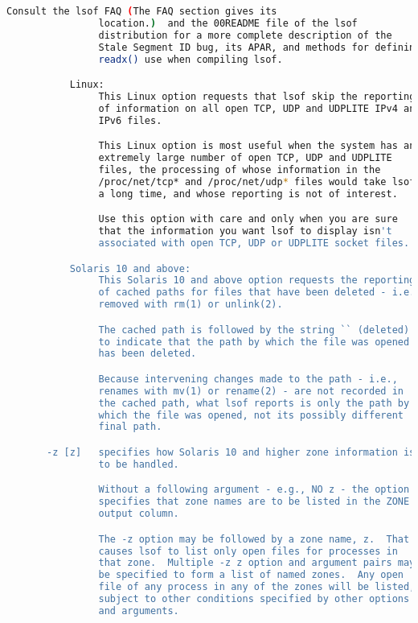 {{\begin{lstlisting}[language=bash]
                Consult the lsof FAQ (The FAQ section gives its
                location.)  and the 00README file of the lsof
                distribution for a more complete description of the
                Stale Segment ID bug, its APAR, and methods for defining
                readx() use when compiling lsof.

           Linux:
                This Linux option requests that lsof skip the reporting
                of information on all open TCP, UDP and UDPLITE IPv4 and
                IPv6 files.

                This Linux option is most useful when the system has an
                extremely large number of open TCP, UDP and UDPLITE
                files, the processing of whose information in the
                /proc/net/tcp* and /proc/net/udp* files would take lsof
                a long time, and whose reporting is not of interest.

                Use this option with care and only when you are sure
                that the information you want lsof to display isn't
                associated with open TCP, UDP or UDPLITE socket files.

           Solaris 10 and above:
                This Solaris 10 and above option requests the reporting
                of cached paths for files that have been deleted - i.e.,
                removed with rm(1) or unlink(2).

                The cached path is followed by the string `` (deleted)''
                to indicate that the path by which the file was opened
                has been deleted.

                Because intervening changes made to the path - i.e.,
                renames with mv(1) or rename(2) - are not recorded in
                the cached path, what lsof reports is only the path by
                which the file was opened, not its possibly different
                final path.

       -z [z]   specifies how Solaris 10 and higher zone information is
                to be handled.

                Without a following argument - e.g., NO z - the option
                specifies that zone names are to be listed in the ZONE
                output column.

                The -z option may be followed by a zone name, z.  That
                causes lsof to list only open files for processes in
                that zone.  Multiple -z z option and argument pairs may
                be specified to form a list of named zones.  Any open
                file of any process in any of the zones will be listed,
                subject to other conditions specified by other options
                and arguments.


\end{lstlisting}}}
